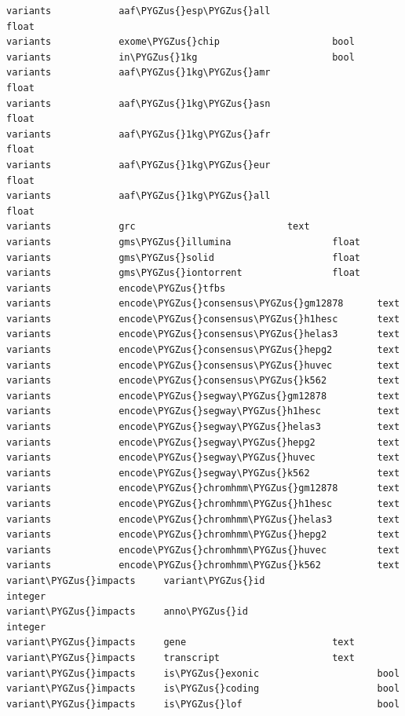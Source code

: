 \documentclass[letterpaper,10pt,english]{sphinxmanual}
\def\PYGZus{\char`\_}
\begin{document}
\begin{Verbatim}[commandchars=\\\{\}]
variants            aaf\PYGZus{}esp\PYGZus{}all                   float
variants            exome\PYGZus{}chip                    bool
variants            in\PYGZus{}1kg                        bool
variants            aaf\PYGZus{}1kg\PYGZus{}amr                   float
variants            aaf\PYGZus{}1kg\PYGZus{}asn                   float
variants            aaf\PYGZus{}1kg\PYGZus{}afr                   float
variants            aaf\PYGZus{}1kg\PYGZus{}eur                   float
variants            aaf\PYGZus{}1kg\PYGZus{}all                   float
variants            grc                           text
variants            gms\PYGZus{}illumina                  float
variants            gms\PYGZus{}solid                     float
variants            gms\PYGZus{}iontorrent                float
variants            encode\PYGZus{}tfbs
variants            encode\PYGZus{}consensus\PYGZus{}gm12878      text
variants            encode\PYGZus{}consensus\PYGZus{}h1hesc       text
variants            encode\PYGZus{}consensus\PYGZus{}helas3       text
variants            encode\PYGZus{}consensus\PYGZus{}hepg2        text
variants            encode\PYGZus{}consensus\PYGZus{}huvec        text
variants            encode\PYGZus{}consensus\PYGZus{}k562         text
variants            encode\PYGZus{}segway\PYGZus{}gm12878         text
variants            encode\PYGZus{}segway\PYGZus{}h1hesc          text
variants            encode\PYGZus{}segway\PYGZus{}helas3          text
variants            encode\PYGZus{}segway\PYGZus{}hepg2           text
variants            encode\PYGZus{}segway\PYGZus{}huvec           text
variants            encode\PYGZus{}segway\PYGZus{}k562            text
variants            encode\PYGZus{}chromhmm\PYGZus{}gm12878       text
variants            encode\PYGZus{}chromhmm\PYGZus{}h1hesc        text
variants            encode\PYGZus{}chromhmm\PYGZus{}helas3        text
variants            encode\PYGZus{}chromhmm\PYGZus{}hepg2         text
variants            encode\PYGZus{}chromhmm\PYGZus{}huvec         text
variants            encode\PYGZus{}chromhmm\PYGZus{}k562          text
variant\PYGZus{}impacts     variant\PYGZus{}id                    integer
variant\PYGZus{}impacts     anno\PYGZus{}id                       integer
variant\PYGZus{}impacts     gene                          text
variant\PYGZus{}impacts     transcript                    text
variant\PYGZus{}impacts     is\PYGZus{}exonic                     bool
variant\PYGZus{}impacts     is\PYGZus{}coding                     bool
variant\PYGZus{}impacts     is\PYGZus{}lof                        bool

\end{Verbatim}
\end{document}
